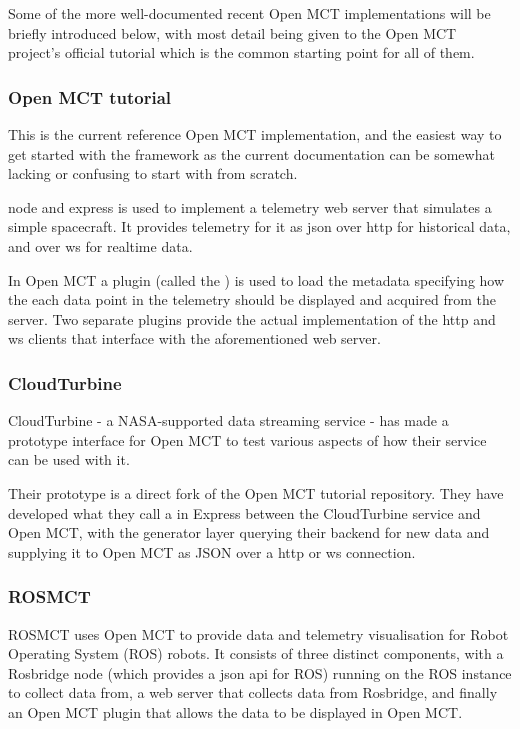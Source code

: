 Some of the more well-documented recent Open MCT implementations will be briefly introduced below, with most detail being given to the Open MCT project's official tutorial which is the common starting point for all of them.

\subsubsection{Open MCT tutorial}
This is the current reference Open MCT implementation, and the easiest way to get started with the framework as the current documentation can be somewhat lacking or confusing to start with from scratch.

\Gls{node} and \Gls{express} is used to implement a telemetry web server that simulates a simple spacecraft. It provides telemetry for it as \acrshort{json} over \acrshort{http} for historical data, and over \Gls{ws} for realtime data.

In Open MCT a plugin (called the ) is used to load the metadata specifying how the each data point in the telemetry should be displayed and acquired from the server. Two separate plugins provide the actual implementation of the \acrshort{http} and \Gls{ws} clients that interface with the aforementioned web server.


\subsubsection{CloudTurbine}
CloudTurbine - a NASA-supported data streaming service - has made a prototype interface for Open MCT to test various aspects of how their service can be used with it.

Their prototype is a direct fork of the Open MCT tutorial repository. They have developed what they call a  in Express between the CloudTurbine service and Open MCT, with the generator layer querying their backend for new data and supplying it to Open MCT as JSON over a \acrshort{http} or \Gls{ws} connection. \cite{cloudturbine}

\subsubsection{ROSMCT}
ROSMCT uses Open MCT to provide data and telemetry visualisation for Robot Operating System (ROS) robots. It consists of three distinct components, with a Rosbridge node (which provides a \acrshort{json} \acrshort{api} for ROS) running on the ROS instance to collect data from, a web server that collects data from Rosbridge, and finally an Open MCT plugin that allows the data to be displayed in Open MCT.

